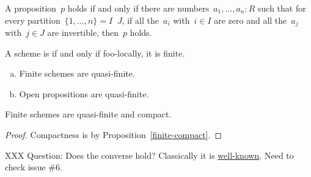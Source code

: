 
\begin{definition}A proposition~$p$ holds  if and only if
there are numbers~$a_1,\ldots,a_n : R$ such that for every
partition~$\{1,\ldots,n\} = I \mathop{\dot\cup} J$, if all the~$a_i$ with~$i
\in I$ are zero and all the~$a_j$ with~$j \in J$ are invertible, then~$p$
holds.
\end{definition}

\begin{definition}A scheme is  if and only if foo-locally,
it is finite.
\end{definition}

\begin{example}
  \begin{enumerate}[(a)]
  \item Finite schemes are quasi-finite.
  \item Open propositions are quasi-finite.
  \end{enumerate}
\end{example}

\begin{proposition}Finite schemes are quasi-finite and
compact.\end{proposition}

\begin{proof}Compactness is by Proposition~\ref{finite-compact}.
\end{proof}

XXX Question: Does the converse hold? Classically it is
\href{https://math.stackexchange.com/questions/4674878/does-quasi-finite-and-\%C3\%A9tale-locally-closed-enough-to-imply-finite}{well-known}.
Need to check issue \#6.
